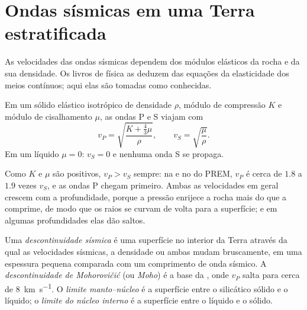 \section{Ondas sísmicas em uma Terra estratificada}

As velocidades das ondas sísmicas dependem dos módulos elásticos da rocha e da sua densidade. Os livros de física as deduzem das equações da elasticidade dos meios contínuos; aqui elas são tomadas como conhecidas.

\begin{proposition}\label{prop:b1:layered-earth:speeds}
Em um sólido elástico isotrópico de densidade $\rho$, módulo de compressão $K$ e módulo de cisalhamento
$\mu$, as ondas P e S viajam com
\[
  v_P = \sqrt{\frac{K + \tfrac43\mu}{\rho}}, \qquad v_S = \sqrt{\frac{\mu}{\rho}}.
\]
Em um líquido $\mu = 0$: $v_S = 0$ e nenhuma onda S se propaga.
\end{proposition}
\admitted

Como $K$ e $\mu$ são positivos, $v_P > v_S$ sempre: na  e no  do PREM, $v_P$ é cerca de $1.8$ a $1.9$ vezes $v_S$, e as ondas P chegam primeiro. Ambas as velocidades em geral crescem com a profundidade, porque a pressão enrijece a rocha mais do que a comprime, de modo que os raios se curvam de volta para a superfície; e em algumas profundidades elas dão saltos.

\begin{definition}
\label{def:b1:layered-earth:discontinuity}
Uma \emph{descontinuidade sísmica} é uma superfície no interior da Terra através da qual as velocidades sísmicas, a densidade ou ambas mudam bruscamente, em uma espessura pequena comparada com um comprimento de onda sísmico. A \emph{descontinuidade de Mohorovičić} (ou \emph{Moho}) é a base da , onde $v_P$ salta para cerca de \qty{8}{km.s^{-1}}. O \emph{limite manto--núcleo} é a superfície entre o  silicático sólido e o  líquido; o \emph{limite do núcleo interno} é a superfície entre o  líquido e o  sólido.
\end{definition}

